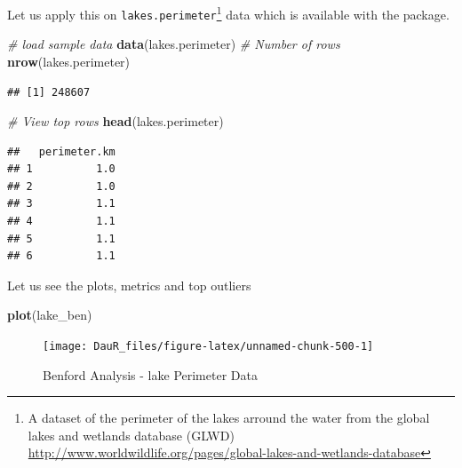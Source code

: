 \documentclass[
]{book}
\newenvironment{Shaded}{\begin{snugshade}}{\end{snugshade}}
\newcommand{\AttributeTok}[1]{\textcolor[rgb]{0.13,0.29,0.53}{#1}}
\newcommand{\CommentTok}[1]{\textcolor[rgb]{0.56,0.35,0.01}{\textit{#1}}}
\newcommand{\DecValTok}[1]{\textcolor[rgb]{0.00,0.00,0.81}{#1}}
\newcommand{\FunctionTok}[1]{\textcolor[rgb]{0.13,0.29,0.53}{\textbf{#1}}}
\newcommand{\NormalTok}[1]{#1}
\newcommand{\OtherTok}[1]{\textcolor[rgb]{0.56,0.35,0.01}{#1}}
\newcommand{\SpecialCharTok}[1]{\textcolor[rgb]{0.81,0.36,0.00}{\textbf{#1}}}
\begin{document}
Let us apply this on \texttt{lakes.perimeter}\footnote{A dataset of the perimeter of the lakes arround the water from the global lakes and wetlands database (GLWD) \url{http://www.worldwildlife.org/pages/global-lakes-and-wetlands-database}} data which is available with the package.

\begin{Shaded}
\begin{Highlighting}[]
\CommentTok{\# load sample data}
\FunctionTok{data}\NormalTok{(lakes.perimeter) }
\CommentTok{\# Number of rows}
\FunctionTok{nrow}\NormalTok{(lakes.perimeter)}
\end{Highlighting}
\end{Shaded}

\begin{verbatim}
## [1] 248607
\end{verbatim}

\begin{Shaded}
\begin{Highlighting}[]
\CommentTok{\# View top rows}
\FunctionTok{head}\NormalTok{(lakes.perimeter)}
\end{Highlighting}
\end{Shaded}

\begin{verbatim}
##   perimeter.km
## 1          1.0
## 2          1.0
## 3          1.1
## 4          1.1
## 5          1.1
## 6          1.1
\end{verbatim}

\begin{Shaded}
\end{Shaded}

Let us see the plots, metrics and top outliers

\begin{Shaded}
\begin{Highlighting}[]
\FunctionTok{plot}\NormalTok{(lake\_ben)}
\end{Highlighting}
\end{Shaded}

\begin{figure}

{\centering \texttt{[image: DauR\_files/figure-latex/unnamed-chunk-500-1]} 

}

\caption{Benford Analysis - lake Perimeter Data}\label{fig:unnamed-chunk-500}
\end{figure}
\end{document}
